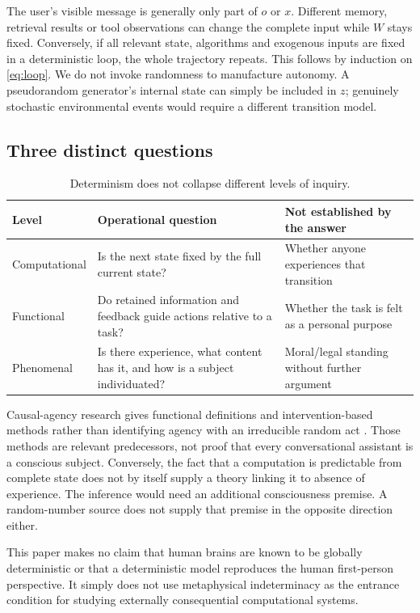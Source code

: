 \documentclass[11pt,a4paper]{article}
\theoremstyle{definition}\newtheorem{definition}{Definition}
\begin{document}
The user's visible message is generally only part of $o$ or $x$. Different memory, retrieval results or tool observations can change the complete input while $W$ stays fixed. Conversely, if all relevant state, algorithms and exogenous inputs are fixed in a deterministic loop, the whole trajectory repeats. This follows by induction on \cref{eq:loop}. We do not invoke randomness to manufacture autonomy. A pseudorandom generator's internal state can simply be included in $z$; genuinely stochastic environmental events would require a different transition model.

\subsection{Three distinct questions}
\begin{table}[ht]
\centering\small
\caption{Determinism does not collapse different levels of inquiry.}
\begin{tabularx}{\linewidth}{@{}lXX@{}}\toprule
Level & Operational question & Not established by the answer\\\midrule
Computational & Is the next state fixed by the full current state? & Whether anyone experiences that transition\\
Functional & Do retained information and feedback guide actions relative to a task? & Whether the task is felt as a personal purpose\\
Phenomenal & Is there experience, what content has it, and how is a subject individuated? & Moral/legal standing without further argument\\\bottomrule
\end{tabularx}
\end{table}
Causal-agency research gives functional definitions and intervention-based methods rather than identifying agency with an irreducible random act \cite{kenton}. Those methods are relevant predecessors, not proof that every conversational assistant is a conscious subject. Conversely, the fact that a computation is predictable from complete state does not by itself supply a theory linking it to absence of experience. The inference would need an additional consciousness premise. A random-number source does not supply that premise in the opposite direction either.

This paper makes no claim that human brains are known to be globally deterministic or that a deterministic model reproduces the human first-person perspective. It simply does not use metaphysical indeterminacy as the entrance condition for studying externally consequential computational systems.
\end{document}
